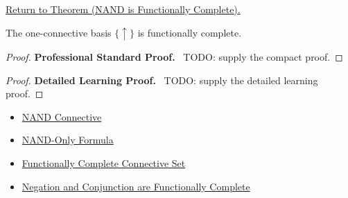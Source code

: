 \newpage
{}
\label{prf:nand-functionally-complete-propositional-logic}

\begin{remark*}[Return]
\hyperref[thm:nand-functionally-complete-propositional-logic]{Return to Theorem (NAND is Functionally Complete).}
\end{remark*}

\begin{theorem*}
The one-connective basis \(\{\uparrow\}\) is functionally complete.
\end{theorem*}

\begin{proof}
\textbf{Professional Standard Proof.}~
TODO: supply the compact proof.
\end{proof}

\begin{proof}
\textbf{Detailed Learning Proof.}~
TODO: supply the detailed learning proof.
\end{proof}

\begin{remark*}
\end{remark*}

\begin{dependencies}
\begin{itemize}
  \item \hyperref[def:nand-connective-propositional-logic]{NAND Connective}
  \item \hyperref[def:nand-only-formula-propositional-logic]{NAND-Only Formula}
  \item \hyperref[def:functionally-complete-connective-set-propositional-logic]{Functionally Complete Connective Set}
  \item \hyperref[thm:negation-conjunction-functionally-complete-propositional-logic]{Negation and Conjunction are Functionally Complete}
\end{itemize}
\end{dependencies}

\clearpage
